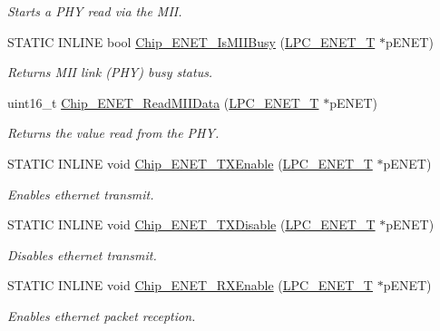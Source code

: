 \begin{DoxyCompactItemize}
\begin{DoxyCompactList}\small\item\em Starts a P\+H\+Y read via the M\+I\+I. \end{DoxyCompactList}\item 
S\+T\+A\+T\+I\+C I\+N\+L\+I\+N\+E bool \hyperlink{group___e_n_e_t__17_x_x__40_x_x_ga2ae5389a2b99d6006980083d02667e07}{Chip\+\_\+\+E\+N\+E\+T\+\_\+\+Is\+M\+I\+I\+Busy} (\hyperlink{struct_l_p_c___e_n_e_t___t}{L\+P\+C\+\_\+\+E\+N\+E\+T\+\_\+\+T} $\ast$p\+E\+N\+E\+T)
\begin{DoxyCompactList}\small\item\em Returns M\+I\+I link (P\+H\+Y) busy status. \end{DoxyCompactList}\item 
uint16\+\_\+t \hyperlink{group___e_n_e_t__17_x_x__40_x_x_gab6d3dfc1cc671503532d00947f236e1d}{Chip\+\_\+\+E\+N\+E\+T\+\_\+\+Read\+M\+I\+I\+Data} (\hyperlink{struct_l_p_c___e_n_e_t___t}{L\+P\+C\+\_\+\+E\+N\+E\+T\+\_\+\+T} $\ast$p\+E\+N\+E\+T)
\begin{DoxyCompactList}\small\item\em Returns the value read from the P\+H\+Y. \end{DoxyCompactList}\item 
S\+T\+A\+T\+I\+C I\+N\+L\+I\+N\+E void \hyperlink{group___e_n_e_t__17_x_x__40_x_x_gacc7e455d4b168d2405b4ef9dda242488}{Chip\+\_\+\+E\+N\+E\+T\+\_\+\+T\+X\+Enable} (\hyperlink{struct_l_p_c___e_n_e_t___t}{L\+P\+C\+\_\+\+E\+N\+E\+T\+\_\+\+T} $\ast$p\+E\+N\+E\+T)
\begin{DoxyCompactList}\small\item\em Enables ethernet transmit. \end{DoxyCompactList}\item 
S\+T\+A\+T\+I\+C I\+N\+L\+I\+N\+E void \hyperlink{group___e_n_e_t__17_x_x__40_x_x_gaaf0d9ef785afa5a847431e86520430c9}{Chip\+\_\+\+E\+N\+E\+T\+\_\+\+T\+X\+Disable} (\hyperlink{struct_l_p_c___e_n_e_t___t}{L\+P\+C\+\_\+\+E\+N\+E\+T\+\_\+\+T} $\ast$p\+E\+N\+E\+T)
\begin{DoxyCompactList}\small\item\em Disables ethernet transmit. \end{DoxyCompactList}\item 
S\+T\+A\+T\+I\+C I\+N\+L\+I\+N\+E void \hyperlink{group___e_n_e_t__17_x_x__40_x_x_gaccc601f3393807fe6255771fb1c47a0b}{Chip\+\_\+\+E\+N\+E\+T\+\_\+\+R\+X\+Enable} (\hyperlink{struct_l_p_c___e_n_e_t___t}{L\+P\+C\+\_\+\+E\+N\+E\+T\+\_\+\+T} $\ast$p\+E\+N\+E\+T)
\begin{DoxyCompactList}\small\item\em Enables ethernet packet reception. \end{DoxyCompactList}\item 

\end{DoxyCompactItemize}
